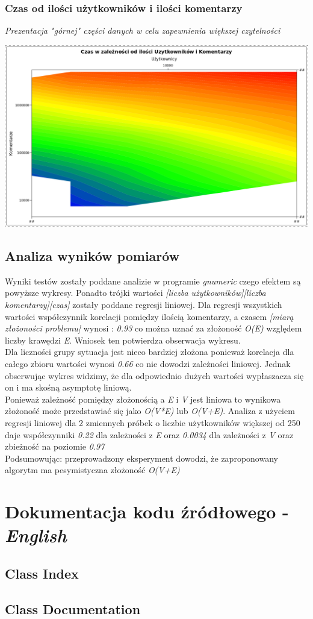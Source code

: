 \documentclass[11pt]{article}
\newcommand{\+}{\discretionary{\mbox{\scriptsize$\hookleftarrow$}}{}{}}
\begin{document}
\subsubsection{Czas od ilości użytkowników i ilości komentarzy}
\textsl{Prezentacja "górnej" części danych w celu zapewnienia większej czytelności}\\
\begin{centering}
	\includegraphics[width=\textwidth]{Wykres3}
\end{centering}
\subsection{Analiza wyników pomiarów}
Wyniki testów zostały poddane analizie w programie \textit{gnumeric} czego efektem są powyższe wykresy. Ponadto trójki wartości \textit{[liczba użytkowników][liczba komentarzy][czas]} zostały poddane regresji liniowej. Dla regresji wszystkich wartości współczynnik korelacji pomiędzy ilością komentarzy, a czasem \textit{[miarą złożoności problemu]} wynosi : \textit{0.93} co można uznać za złożoność \textit{O(E)} względem liczby krawędzi \textit{E}. Wniosek ten potwierdza obserwacja wykresu.
\\
Dla liczności grupy sytuacja jest nieco bardziej złożona ponieważ korelacja dla całego zbioru wartości wynosi \textit{0.66} co nie dowodzi zależności liniowej. Jednak  
obserwując wykres widzimy, że dla odpowiednio dużych wartości wypłaszacza się on i ma skośną asymptotę liniową.
\\
Ponieważ zależność pomiędzy złożonością a \textit{E} i \textit{V} jest liniowa to wynikowa złożoność może przedstawiać się jako \textit{O(V*E)} lub \textit{O(V+E)}. Analiza z użyciem regresji liniowej dla 2 zmiennych próbek o liczbie użytkowników większej od 250 daje współczynniki \textit{0.22} dla zależności z \textit{E} oraz \textit{0.0034} dla zależności z \textit{V} oraz zbieżność na poziomie \textit{0.97} 
\\ 
Podsumowując: przeprowadzony eksperyment dowodzi, że zaproponowany algorytm ma pesymistyczna złożoność \textit{O(V+E)}
\clearpage  
\section{Dokumentacja kodu źródłowego - \textit{English}}
\subsection{Class Index}

\subsection{Class Documentation}
 
   
\end{document}
